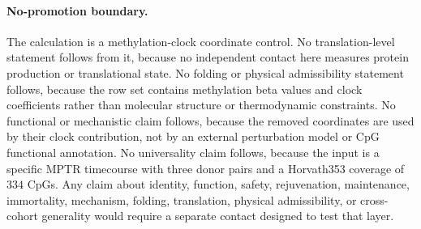 \paragraph{No-promotion boundary.}
The calculation is a methylation-clock coordinate control.  No translation-level statement follows from it, because no independent contact here measures protein production or translational state.  No folding or physical admissibility statement follows, because the row set contains methylation beta values and clock coefficients rather than molecular structure or thermodynamic constraints.  No functional or mechanistic claim follows, because the removed coordinates are used by their clock contribution, not by an external perturbation model or CpG functional annotation.  No universality claim follows, because the input is a specific MPTR timecourse with three donor pairs and a Horvath353 coverage of $334$ CpGs.  Any claim about identity, function, safety, rejuvenation, maintenance, immortality, mechanism, folding, translation, physical admissibility, or cross-cohort generality would require a separate contact designed to test that layer.
